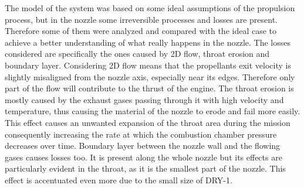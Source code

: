 The model of the system was based on some ideal assumptions of the propulsion process, but in the nozzle some irreversible processes and losses are present. Therefore some of them were analyzed and compared with the ideal case to achieve a better understanding of what really happens in the nozzle.
The losses considered are specifically the ones caused by 2D flow, throat erosion and boundary layer. Considering 2D flow means that the propellants exit velocity is slightly misaligned from the nozzle axis, especially near its edges.
Therefore only part of the flow will contribute to the thrust of the engine. The throat erosion is mostly caused by the exhaust gases passing through it with high velocity and temperature, thus causing the material of the nozzle to erode and fail more easily.
This effect causes an unwanted expansion of the throat area during the mission consequently increasing the rate at which the combustion chamber pressure decreases over time. Boundary layer between the nozzle wall and the flowing gases causes losses too.
It is present along the whole nozzle but its effects are particularly evident in the throat, as it is the smallest part of the nozzle. This effect is accentuated even more due to the small size of DRY-1.